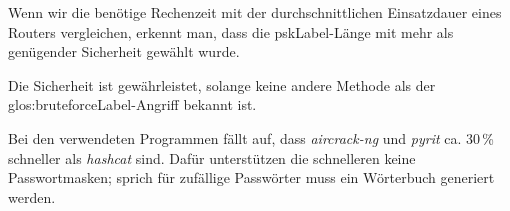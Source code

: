 Wenn wir die benötige Rechenzeit mit der durchschnittlichen Einsatzdauer eines Routers vergleichen, erkennt man, dass die \gls{pskLabel}-Länge mit mehr als genügender Sicherheit gewählt wurde.

Die Sicherheit ist gewährleistet, solange keine andere Methode als der \gls{glos:bruteforceLabel}-Angriff bekannt ist.

Bei den verwendeten Programmen fällt auf, dass \textit{aircrack-ng} und \textit{pyrit} ca. 30\,\% schneller als \textit{hashcat} sind. Dafür unterstützen die schnelleren keine Passwortmasken; sprich für zufällige Passwörter muss ein Wörterbuch generiert werden.
